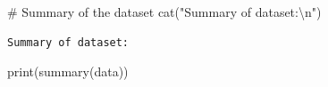 \documentclass[
]{article}
\newenvironment{Shaded}{\begin{snugshade}}{\end{snugshade}}
\newcommand{\CommentTok}[1]{\textcolor[rgb]{0.37,0.37,0.37}{#1}}
\newcommand{\FunctionTok}[1]{\textcolor[rgb]{0.28,0.35,0.67}{#1}}
\newcommand{\NormalTok}[1]{\textcolor[rgb]{0.00,0.23,0.31}{#1}}
\newcommand{\SpecialCharTok}[1]{\textcolor[rgb]{0.37,0.37,0.37}{#1}}
\newcommand{\StringTok}[1]{\textcolor[rgb]{0.13,0.47,0.30}{#1}}
\begin{document}
\begin{Shaded}
\begin{Highlighting}[]
\CommentTok{\# Summary of the dataset}
\FunctionTok{cat}\NormalTok{(}\StringTok{"Summary of dataset:}\SpecialCharTok{\textbackslash{}n}\StringTok{"}\NormalTok{)}
\end{Highlighting}
\end{Shaded}

\begin{verbatim}
Summary of dataset:
\end{verbatim}

\begin{Shaded}
\begin{Highlighting}[]
\FunctionTok{print}\NormalTok{(}\FunctionTok{summary}\NormalTok{(data))}
\end{Highlighting}
\end{Shaded}
\end{document}
